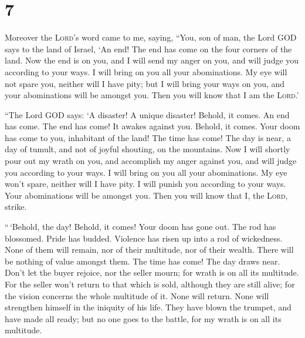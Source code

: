 \hypertarget{section-6}{%
\section{7}\label{section-6}}

 Moreover the \textsc{Lord}'s word came to me, saying,
 ``You, son of man, the Lord GOD says to the land of
Israel, `An end! The end has come on the four corners of the land.
 Now the end is on you, and I will send my anger on you,
and will judge you according to your ways. I will bring on you all your
abominations.  My eye will not spare you, neither will I
have pity; but I will bring your ways on you, and your abominations will
be amongst you. Then you will know that I am the \textsc{Lord}.'

 ``The Lord GOD says: `A disaster! A unique disaster!
Behold, it comes.  An end has come. The end has come! It
awakes against you. Behold, it comes.  Your doom has come
to you, inhabitant of the land! The time has come! The day is near, a
day of tumult, and not of joyful shouting, on the mountains.
 Now I will shortly pour out my wrath on you, and
accomplish my anger against you, and will judge you according to your
ways. I will bring on you all your abominations.  My eye
won't spare, neither will I have pity. I will punish you according to
your ways. Your abominations will be amongst you. Then you will know
that I, the \textsc{Lord}, strike.

 ``\,`Behold, the day! Behold, it comes! Your doom has
gone out. The rod has blossomed. Pride has budded. 
Violence has risen up into a rod of wickedness. None of them will
remain, nor of their multitude, nor of their wealth. There will be
nothing of value amongst them.  The time has come! The
day draws near. Don't let the buyer rejoice, nor the seller mourn; for
wrath is on all its multitude.  For the seller won't
return to that which is sold, although they are still alive; for the
vision concerns the whole multitude of it. None will return. None will
strengthen himself in the iniquity of his life.  They
have blown the trumpet, and have made all ready; but no one goes to the
battle, for my wrath is on all its multitude.

